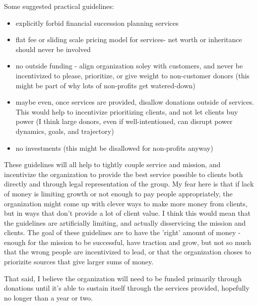 \documentclass{proposalnsf}
\begin{document}
Some suggested practical guidelines:
      \begin{itemize}
        \item{explicitly forbid financial succession planning services}
        \item{flat fee or sliding scale pricing model for services- net worth or inheritance should never be involved}
        \item{no outside funding - align organization soley with customers, and never be incentivized to please, prioritize, or give weight to non-customer donors (this might be part of why lots of non-profits get watered-down)}
        \item{    maybe even, once services are provided, disallow donations outside of services. This would help to incentivize prioritizing clients, and not let clients buy power (I think large donors, even if well-intentioned, can disrupt power dynamics, goals, and trajectory)}
        \item{no investments (this might be disallowed for non-profits anyway)}
      \end{itemize}


These guidelines will all help to tightly couple service and mission, and incentivize the organization to provide the best service possible to clients both directly and through legal representation of the group. My fear here is that if lack of money is limiting growth or not enough to pay people appropriately, the organization might come up with clever ways to make more money from clients, but in ways that don't provide a lot of client value. I think this would mean that the guidelines are artificially limiting, and actually disservicing the mission and clients. The goal of these guidelines are to have the 'right' amount of money - enough for the mission to be successful, have traction and grow, but not so much that the wrong people are incentivized to lead, or that the organization choses to priorizite sources that give larger sums of money.

That said, I believe the organization will need to be funded primarily through donations until it's able to sustain itself through the services provided, hopefully no longer than a year or two.
\end{document}
